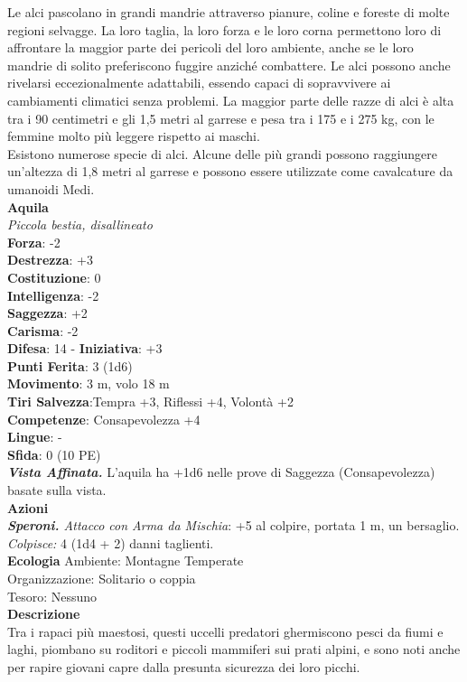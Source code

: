 \begin{multicols}{2}
Le alci pascolano in grandi mandrie attraverso pianure, coline e foreste di molte regioni selvagge. La loro taglia, la loro forza e le loro corna permettono loro di affrontare la maggior parte dei pericoli del loro ambiente, anche se le loro mandrie di solito preferiscono fuggire anziché combattere. Le alci possono anche rivelarsi eccezionalmente adattabili, essendo capaci di sopravvivere ai cambiamenti climatici senza problemi. La maggior parte delle razze di alci è alta tra i 90 centimetri e gli 1,5 metri al garrese e pesa tra i 175 e i 275 kg, con le femmine molto più leggere rispetto ai maschi.\\
Esistono numerose specie di alci. Alcune delle più grandi possono raggiungere un'altezza di 1,8 metri al garrese e possono essere utilizzate come cavalcature da umanoidi Medi.\\


\medskip\textbf{Aquila}\\
\emph{Piccola bestia, disallineato}\\
\textbf{Forza}: -2\\
\textbf{Destrezza}: +3\\
\textbf{Costituzione}: 0\\
\textbf{Intelligenza}: -2\\
\textbf{Saggezza}: +2\\
\textbf{Carisma}: -2\\
\textbf{Difesa}: 14 - \textbf{Iniziativa}: +3\\
\textbf{Punti Ferita}: 3 (1d6)\\
\textbf{Movimento}: 3 m, volo 18 m\\
\textbf{Tiri Salvezza}:Tempra +3, Riflessi +4, Volontà +2\\
\textbf{Competenze}: Consapevolezza +4\\
\textbf{Lingue}: -\\
\textbf{Sfida}: 0 (10 PE)\smallskip\\
\emph{\textbf{Vista Affinata.}} L'aquila ha +1d6 nelle prove di Saggezza (Consapevolezza) basate sulla vista.\\
\smallskip\textbf{Azioni}\\
\emph{\textbf{Speroni.} Attacco con Arma da Mischia}: +5 al colpire, portata 1 m, un bersaglio.\\
\emph{Colpisce:} 4 (1d4 + 2) danni taglienti.\\
\textbf{Ecologia}
Ambiente: Montagne Temperate\\
Organizzazione: Solitario o coppia\\
Tesoro: Nessuno\\
\textbf{Descrizione}\\
Tra i rapaci più maestosi, questi uccelli predatori ghermiscono pesci da fiumi e laghi, piombano su roditori e piccoli mammiferi sui prati alpini, e sono noti anche per rapire giovani capre dalla presunta sicurezza dei loro picchi.\\


\end{multicols}
